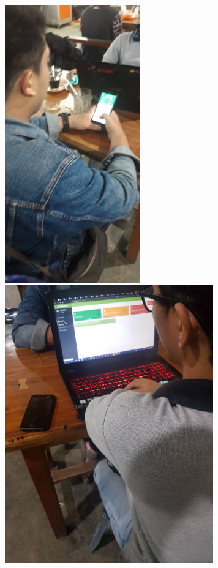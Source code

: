 \begin{figure}[H]
	\includegraphics [height= 12cm]{gambar/pengujian/uji3}
	\includegraphics [height = 12cm]{gambar/pengujian/uji1}
\end{figure}
